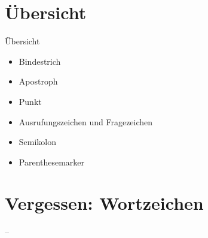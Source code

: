 \section{Übersicht}

\begin{frame}
  {Übersicht}
  \onslide<+->
  \begin{itemize}[<+->]
    \item Bindestrich
    \item Apostroph
    \item Punkt
    \item Ausrufungszeichen und Fragezeichen
    \item Semikolon
      \Zeile
    \item Parenthesemarker
  \end{itemize}
\end{frame}

\section[Wortzeichen]{Vergessen: Wortzeichen}

\begin{frame}
  {--}
  \onslide<+->
  \onslide<+->
  \begin{exe}
    \ex
    \begin{xlist}
    \end{xlist}
    \ex
    \begin{xlist}
    \end{xlist}
    \ex
    \begin{xlist}
    \end{xlist}
    \ex
    \begin{xlist}
    \end{xlist}
    \ex
    \begin{xlist}
    \end{xlist}
  \end{exe}
\end{frame}

